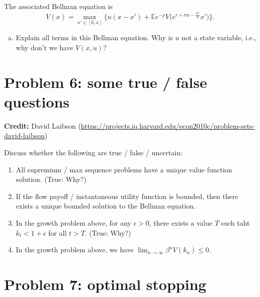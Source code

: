 \documentclass[11pt]{extarticle}
\theoremstyle{plain}
\theoremstyle{definition}
\begin{document}
The associated Bellman equation is 
\begin{equation*}
	V(x) = \max_{x' \in [0, x]} \bigg\{ u(x - x') + \mathbb E e^{- \rho} V \bigg( e^{r + \sigma u - \frac{\sigma^2}{2}} x' \bigg) \bigg\}.
\end{equation*}

\begin{enumerate}[(a)]
\item Explain all terms in this Bellman equation. Why is $u$ not a state variable, i.e., why don't we have $V(x, u)$?

\end{enumerate}


\vspace{10mm}
\section*{Problem 6: some true / false questions}

\textbf{Credit:} David Laibson (\url{https://projects.iq.harvard.edu/econ2010c/problem-sets-david-laibson})

\vspace{5mm}
\noindent
Discuss whether the following are true / false / uncertain:
\begin{enumerate}
\item All supremium / max sequence problems have a unique value function solution. (True: Why?) 

\item If the flow payoff / instantaneous utility function is bounded, then there exists a unique bounded solution to the Bellman equation. 

\item In the growth problem above, for any $\epsilon > 0$, there exists a value $T$ such taht $k_t < 1 + \epsilon$ for all $t > T$. (True: Why?)

\item In the growth problem above, we have $\lim_{n \to \infty} \beta^n V(k_n) \leq 0$. 
\end{enumerate}




\vspace{10mm}
\section*{Problem 7: optimal stopping}
\end{document}
